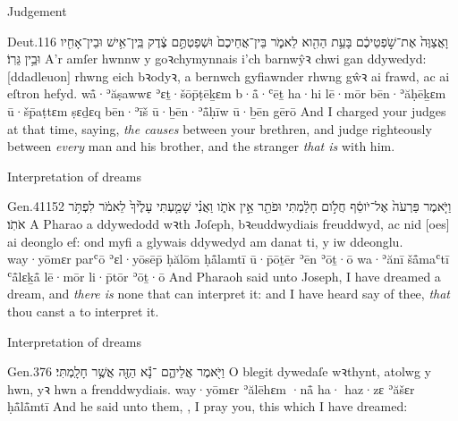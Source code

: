 \begin{frame}{\ex Judgement}
	\begin{example}{Deut.}{1}{16}{}{}
		\quoling
		{וָאֲצַוֶּה֙ אֶת־שֹׁ֣פְטֵיכֶ֔ם בָּעֵ֥ת הַהִ֖וא לֵאמֹ֑ר  בֵּין־אֲחֵיכֶם֙ וּשְׁפַטְתֶּ֣ם צֶ֔דֶק בֵּֽין־אִ֥ישׁ וּבֵין־אָחִ֖יו וּבֵ֥ין גֵּרֽוֹ׃}
		{A’r amſer hwnnw y goꝛchymynnais i’ch barnwŷꝛ chwi gan ddywedyd:  [ddadleuon] rhwng eich bꝛodyꝛ, a bernwch gyfiawnder rhwng gŵꝛ ai frawd, ac ai eſtron hefyd.}
		{wå̄·ʾăṣawwɛ ʾɛṯ·šōp̄ṭēḵɛm b·å̄·ʿēṯ ha·hi lē·mōr  bēn·ʾăḥēḵɛm ū·šp̄aṭtɛm ṣɛḏɛq bēn·ʾīš ū·ḇēn·ʾå̄ḥīw ū·ḇēn gērō}
		{And I charged your judges at that time, saying,  \emph{the causes} between your brethren, and judge righteously between \emph{every} man and his brother, and the stranger \emph{that is} with him.}
	\end{example}
\end{frame}


\begin{frame}{\ex Interpretation of dreams}
	\begin{example}{Gen.}{41}{15}{2}{}
		\quoling
		{וַיֹּ֤אמֶר פַּרְעֹה֙ אֶל־יֹוסֵ֔ף חֲלֹ֣ום חָלַ֔מְתִּי וּפֹתֵ֖ר אֵ֣ין אֹתֹ֑ו וַאֲנִ֗י שָׁמַ֤עְתִּי עָלֶ֙יךָ֙ לֵאמֹ֔ר   לִפְתֹּ֥ר אֹתֹֽו׃}
		{A Pharao a ddywedodd wꝛth Joſeph, bꝛeuddwydiais freuddwyd, ac nid [oes] ai deonglo ef: ond myfi a glywais ddywedyd am danat ti, y   iw ddeonglu.}
		{way·yōmɛr parʿō ʾɛl·yōsēp̄ ḥălōm ḥå̄lamtī ū·p̄ōṯēr ʾēn ʾōṯ·ō wa·ʾănī šå̄maʿtī ʿå̄lɛḵå̄ lē·mōr   li·p̄tōr ʾōṯ·ō}
		{And Pharaoh said unto Joseph, I have dreamed a dream, and \textit{there is} none that can interpret it: and I have heard say of thee, \textit{that} thou canst  a  to interpret it.}
	\end{example}
\end{frame}


\begin{frame}{\ex Interpretation of dreams}
	\begin{example}{Gen.}{37}{6}{}{}
		\quoling
		{וַיֹּ֖אמֶר אֲלֵיהֶ֑ם ־נָ֕א  הַזֶּ֖ה אֲשֶׁ֥ר חָלָֽמְתִּי׃}
		{O blegit dywedaſe wꝛthynt,  atolwg y  hwn, yꝛ hwn a frenddwydiais.}
		{way·yōmɛr ʾălēhɛm ·nå̄ ha· haz·zɛ ʾăšɛr ḥå̄lå̄mtī}
		{And he said unto them, , I pray you, this  which I have dreamed:}
	\end{example}
\end{frame}


